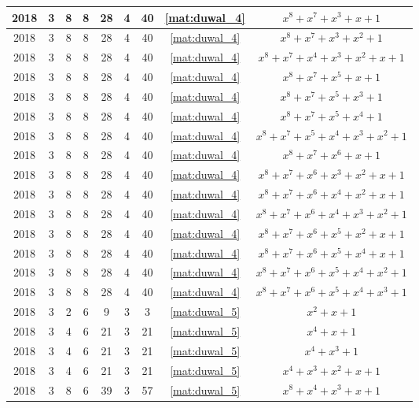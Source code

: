 \begin{longtable}{|c|c|c|c|c|c|c|c|c|}
2018 & 3 & 8 & 8 & 28 & 4 & 40 & \eqref{mat:duwal_4} & $x^8 + x^7 + x^3 + x + 1$ \\ \hline 
2018 & 3 & 8 & 8 & 28 & 4 & 40 & \eqref{mat:duwal_4} & $x^8 + x^7 + x^3 + x^2 + 1$ \\ \hline 
2018 & 3 & 8 & 8 & 28 & 4 & 40 & \eqref{mat:duwal_4} & $x^8 + x^7 + x^4 + x^3 + x^2 + x + 1$ \\ \hline 
2018 & 3 & 8 & 8 & 28 & 4 & 40 & \eqref{mat:duwal_4} & $x^8 + x^7 + x^5 + x + 1$ \\ \hline 
2018 & 3 & 8 & 8 & 28 & 4 & 40 & \eqref{mat:duwal_4} & $x^8 + x^7 + x^5 + x^3 + 1$ \\ \hline 
2018 & 3 & 8 & 8 & 28 & 4 & 40 & \eqref{mat:duwal_4} & $x^8 + x^7 + x^5 + x^4 + 1$ \\ \hline 
2018 & 3 & 8 & 8 & 28 & 4 & 40 & \eqref{mat:duwal_4} & $x^8 + x^7 + x^5 + x^4 + x^3 + x^2 + 1$ \\ \hline 
2018 & 3 & 8 & 8 & 28 & 4 & 40 & \eqref{mat:duwal_4} & $x^8 + x^7 + x^6 + x + 1$ \\ \hline 
2018 & 3 & 8 & 8 & 28 & 4 & 40 & \eqref{mat:duwal_4} & $x^8 + x^7 + x^6 + x^3 + x^2 + x + 1$ \\ \hline 
2018 & 3 & 8 & 8 & 28 & 4 & 40 & \eqref{mat:duwal_4} & $x^8 + x^7 + x^6 + x^4 + x^2 + x + 1$ \\ \hline 
2018 & 3 & 8 & 8 & 28 & 4 & 40 & \eqref{mat:duwal_4} & $x^8 + x^7 + x^6 + x^4 + x^3 + x^2 + 1$ \\ \hline 
2018 & 3 & 8 & 8 & 28 & 4 & 40 & \eqref{mat:duwal_4} & $x^8 + x^7 + x^6 + x^5 + x^2 + x + 1$ \\ \hline 
2018 & 3 & 8 & 8 & 28 & 4 & 40 & \eqref{mat:duwal_4} & $x^8 + x^7 + x^6 + x^5 + x^4 + x + 1$ \\ \hline 
2018 & 3 & 8 & 8 & 28 & 4 & 40 & \eqref{mat:duwal_4} & $x^8 + x^7 + x^6 + x^5 + x^4 + x^2 + 1$ \\ \hline 
2018 & 3 & 8 & 8 & 28 & 4 & 40 & \eqref{mat:duwal_4} & $x^8 + x^7 + x^6 + x^5 + x^4 + x^3 + 1$ \\ \hline 
2018 & 3 & 2 & 6 & 9 & 3 & 3 & \eqref{mat:duwal_5} & $x^2 + x + 1$ \\ \hline 
2018 & 3 & 4 & 6 & 21 & 3 & 21 & \eqref{mat:duwal_5} & $x^4 + x + 1$ \\ \hline 
2018 & 3 & 4 & 6 & 21 & 3 & 21 & \eqref{mat:duwal_5} & $x^4 + x^3 + 1$ \\ \hline 
2018 & 3 & 4 & 6 & 21 & 3 & 21 & \eqref{mat:duwal_5} & $x^4 + x^3 + x^2 + x + 1$ \\ \hline 
2018 & 3 & 8 & 6 & 39 & 3 & 57 & \eqref{mat:duwal_5} & $x^8 + x^4 + x^3 + x + 1$ \\ \hline 

\end{longtable}
